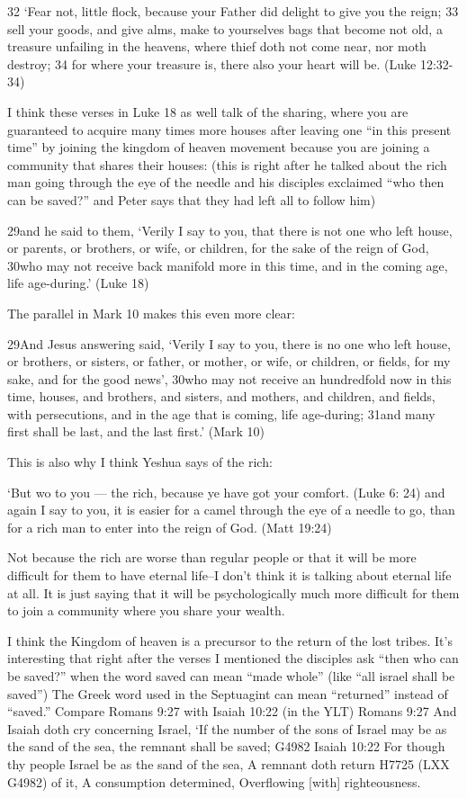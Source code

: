 \documentclass[11pt]{article}
\begin{document}
32 `Fear not, little flock, because your Father did delight to give you the reign; 33 sell your goods, and give alms, make to yourselves bags that become not old, a treasure unfailing in the heavens, where thief doth not come near, nor moth destroy; 34 for where your treasure is, there also your heart will be. (Luke 12:32-34)

I think these verses in Luke 18 as well talk of the sharing, where you
are guaranteed to acquire many times more houses after leaving one “in
this present time” by joining the kingdom of heaven movement because
you are joining a community that shares their houses: (this is right
after he talked about the rich man going through the eye of the needle
and his disciples exclaimed “who then can be saved?” and Peter says
that they had left all to follow him)

29and he said to them, ‘Verily I say to you, that there is not one who left house, or parents, or brothers, or wife, or children, for the sake of the reign of God, 30who may not receive back manifold more in this time, and in the coming age, life age-during.’ (Luke 18)

The parallel in Mark 10 makes this even more clear:

29And Jesus answering said, ‘Verily I say to you, there is no one who left house, or brothers, or sisters, or father, or mother, or wife, or children, or fields, for my sake, and for the good news’, 30who may not receive an hundredfold now in this time, houses, and brothers, and sisters, and mothers, and children, and fields, with persecutions, and in the age that is coming, life age-during; 31and many first shall be last, and the last first.’ (Mark 10)

This is also why I think Yeshua says of the rich:

‘But wo to you — the rich, because ye have got your comfort. (Luke 6: 24)
and again I say to you, it is easier for a camel through the eye of a needle to go, than for a rich man to enter into the reign of God. (Matt 19:24)

Not because the rich are worse than regular people or that it will be
more difficult for them to have eternal life–I don’t think it is
talking about eternal life at all. It is just saying that it will be
psychologically much more difficult for them to join a community where
you share your wealth.

I think the Kingdom of heaven is a precursor to the return of the lost
tribes. It’s interesting that right after the verses I mentioned the
disciples ask “then who can be saved?” when the word saved can mean
“made whole” (like “all israel shall be saved”)
The Greek word used in the Septuagint can mean “returned” instead of “saved.”
Compare Romans 9:27 with Isaiah 10:22 (in the YLT)
Romans 9:27 And Isaiah doth cry concerning Israel, `If the number of the sons of Israel may be as the sand of the sea, the remnant shall be saved; G4982
Isaiah 10:22 For though thy people Israel be as the sand of the sea, A remnant doth return H7725 (LXX G4982) of it, A consumption determined, Overflowing [with] righteousness.
\end{document}
